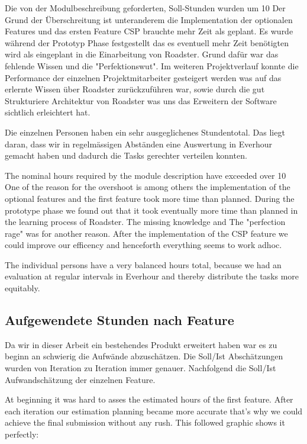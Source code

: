 Die von der Modulbeschreibung geforderten, Soll-Stunden wurden um 10%
Der Grund der Überschreitung ist unteranderem
die Implementation der optionalen Features und das ersten Feature CSP brauchte mehr Zeit als geplant. Es wurde während der Prototyp Phase
festgestellt das es eventuell mehr Zeit benötigten wird als eingeplant in die Einarbeitung von Roadster. 
Grund dafür war das fehlende Wissen und die "Perfektionswut".
Im weiteren Projektverlauf konnte die Performance der einzelnen Projektmitarbeiter gesteigert werden
was auf das erlernte Wissen über Roadster zurückzuführen war, sowie durch die gut
Strukturiere Architektur von Roadster was uns das Erweitern der Software sichtlich erleichtert hat.

Die einzelnen Personen haben ein sehr ausgeglichenes Stundentotal. 
Das liegt daran, dass wir in regelmässigen Abständen eine Auswertung 
in Everhour gemacht haben und dadurch die Tasks gerechter verteilen konnten. 

The nominal hours required by the module description have exceeded over 10%
One of the reason for the overshoot is among others the implementation of the optional features and the first feature took more time than planned. 
During the prototype phase we found out that it took eventually more time than planned in the learning process of Roadster. The missing knowledge and
The "perfection rage" was for another reason.
After the implementation of the CSP feature we could improve our efficency and henceforth everything seems to work adhoc.

The individual persons have a very balanced hours total, because we had an evaluation at regular intervals
in Everhour and thereby distribute the tasks more equitably.


\subsection{Aufgewendete Stunden nach Feature}
Da wir in dieser Arbeit ein bestehendes Produkt erweitert haben war es zu beginn an
schwierig die Aufwände abzuschätzen. Die Soll/Ist Abschätzungen wurden von Iteration zu Iteration
immer genauer. Nachfolgend die Soll/Ist Aufwandschätzung der einzelnen Feature.

At beginning it was hard to asses the estimated hours of the first feature. After each iteration our estimation planning
became more accurate that's why we could achieve the final submission without any rush. This followed graphic shows it perfectly:


